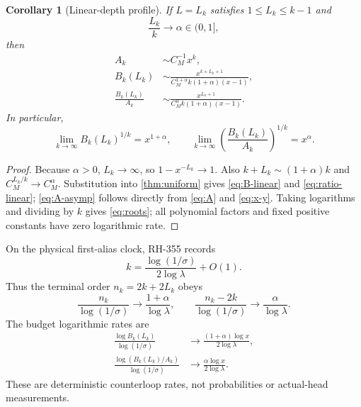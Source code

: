 \documentclass[11pt]{article}
\newtheorem{corollary}[theorem]{Corollary}
\theoremstyle{remark}
\begin{document}
\begin{corollary}[Linear-depth profile]\label{cor:linear}
If $L=L_k$ satisfies $1\le L_k\le k-1$ and
\[
 \frac{L_k}{k}\longrightarrow\alpha\in(0,1],
\]
then
\begin{align}
 A_k&\sim C_M^{-1}x^k,\label{eq:A-asymp}\\
 B_k(L_k)&\sim
 \frac{x^{k+L_k+1}}
 {C_M^{1+\alpha}k(1+\alpha)(x-1)},\label{eq:B-linear}\\
 \frac{B_k(L_k)}{A_k}&\sim
 \frac{x^{L_k+1}}
 {C_M^{\alpha}k(1+\alpha)(x-1)}.\label{eq:ratio-linear}
\end{align}
In particular,
\begin{equation}\label{eq:roots}
 \lim_{k\to\infty}B_k(L_k)^{1/k}=x^{1+\alpha},
 \qquad
 \lim_{k\to\infty}\left(\frac{B_k(L_k)}{A_k}\right)^{1/k}=x^\alpha.
\end{equation}
\end{corollary}

\begin{proof}
Because $\alpha>0$, $L_k\to\infty$, so $1-x^{-L_k}\to1$.  Also
$k+L_k\sim(1+\alpha)k$ and $C_M^{L_k/k}\to C_M^\alpha$.
Substitution into \cref{thm:uniform} gives \eqref{eq:B-linear} and
\eqref{eq:ratio-linear}; \eqref{eq:A-asymp} follows directly from
\eqref{eq:A} and \eqref{eq:x-y}.  Taking logarithms and dividing by $k$
gives \eqref{eq:roots}; all polynomial factors and fixed positive constants
have zero logarithmic rate.
\end{proof}

On the physical first-alias clock, RH-355 records
\begin{equation}\label{eq:clock}
 k=\frac{\log(1/\sigma)}{2\log\lambda}+O(1).
\end{equation}
Thus the terminal order $n_k=2k+2L_k$ obeys
\begin{equation}\label{eq:order-rate}
 \frac{n_k}{\log(1/\sigma)}\longrightarrow\frac{1+\alpha}{\log\lambda},
 \qquad
 \frac{n_k-2k}{\log(1/\sigma)}\longrightarrow\frac{\alpha}{\log\lambda}.
\end{equation}
The budget logarithmic rates are
\begin{align}
 \frac{\log B_k(L_k)}{\log(1/\sigma)}&\longrightarrow
 \frac{(1+\alpha)\log x}{2\log\lambda},\label{eq:B-clock-rate}\\
 \frac{\log(B_k(L_k)/A_k)}{\log(1/\sigma)}&\longrightarrow
 \frac{\alpha\log x}{2\log\lambda}.\label{eq:ratio-clock-rate}
\end{align}
These are deterministic counterloop rates, not probabilities or actual-head
measurements.
\end{document}
